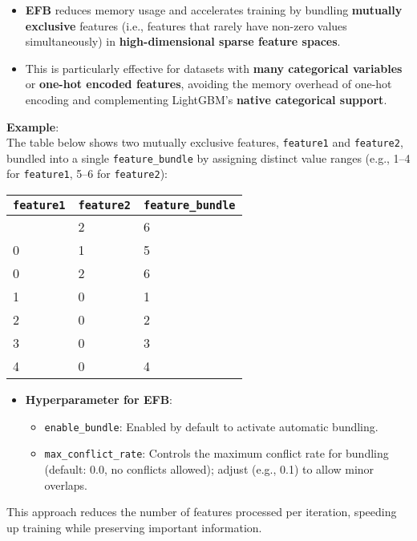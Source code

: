 \documentclass[
  letterpaper,
  DIV=11,
  numbers=noendperiod]{scrreprt}
\providecommand{\tightlist}{%
  \setlength{\itemsep}{0pt}\setlength{\parskip}{0pt}}\usepackage{longtable,booktabs,array}
\begin{document}
\begin{itemize}
\tightlist
\item
  \textbf{EFB} reduces memory usage and accelerates training by bundling
  \textbf{mutually exclusive} features (i.e., features that rarely have
  non-zero values simultaneously) in \textbf{high-dimensional sparse
  feature spaces}.
\item
  This is particularly effective for datasets with \textbf{many
  categorical variables} or \textbf{one-hot encoded features}, avoiding
  the memory overhead of one-hot encoding and complementing LightGBM's
  \textbf{native categorical support}.
\end{itemize}

\textbf{Example}:\\
The table below shows two mutually exclusive features, \texttt{feature1}
and \texttt{feature2}, bundled into a single \texttt{feature\_bundle} by
assigning distinct value ranges (e.g., 1--4 for \texttt{feature1}, 5--6
for \texttt{feature2}):

\begin{longtable}[]{@{}lll@{}}
\toprule\noalign{}
\texttt{feature1} & \texttt{feature2} & \texttt{feature\_bundle} \\
\midrule\noalign{}
\endhead
\bottomrule\noalign{}
\endlastfoot
0 & 2 & 6 \\
0 & 1 & 5 \\
0 & 2 & 6 \\
1 & 0 & 1 \\
2 & 0 & 2 \\
3 & 0 & 3 \\
4 & 0 & 4 \\
\end{longtable}

\begin{itemize}
\tightlist
\item
  \textbf{Hyperparameter for EFB}:

  \begin{itemize}
  \tightlist
  \item
    \texttt{enable\_bundle}: Enabled by default to activate automatic
    bundling.
  \item
    \texttt{max\_conflict\_rate}: Controls the maximum conflict rate for
    bundling (default: 0.0, no conflicts allowed); adjust (e.g., 0.1) to
    allow minor overlaps.
  \end{itemize}
\end{itemize}

This approach reduces the number of features processed per iteration,
speeding up training while preserving important information.
\end{document}
